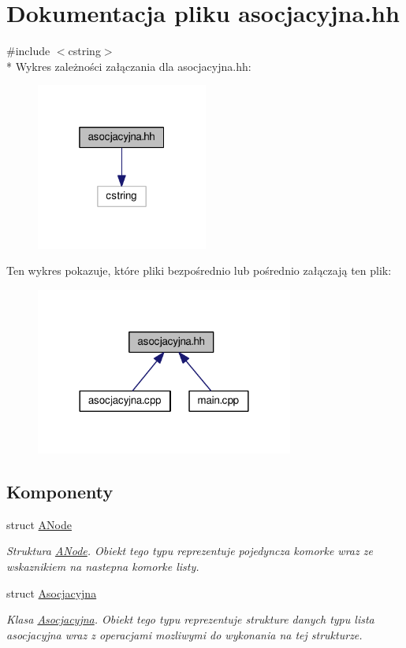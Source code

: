 \hypertarget{asocjacyjna_8hh}{\section{Dokumentacja pliku asocjacyjna.\-hh}
\label{asocjacyjna_8hh}
}
{\ttfamily \#include $<$cstring$>$}\\*
Wykres zależności załączania dla asocjacyjna.\-hh\-:
\nopagebreak
\begin{figure}[H]
\begin{center}
\leavevmode
\includegraphics[width=160pt]{asocjacyjna_8hh__incl}
\end{center}
\end{figure}
Ten wykres pokazuje, które pliki bezpośrednio lub pośrednio załączają ten plik\-:
\nopagebreak
\begin{figure}[H]
\begin{center}
\leavevmode
\includegraphics[width=240pt]{asocjacyjna_8hh__dep__incl}
\end{center}
\end{figure}
\subsection*{Komponenty}
\begin{DoxyCompactItemize}
\item 
struct \hyperlink{struct_a_node}{A\-Node}
\begin{DoxyCompactList}\small\item\em Struktura \hyperlink{struct_a_node}{A\-Node}. Obiekt tego typu reprezentuje pojedyncza komorke wraz ze wskaznikiem na nastepna komorke listy. \end{DoxyCompactList}\item 
struct \hyperlink{struct_asocjacyjna}{Asocjacyjna}
\begin{DoxyCompactList}\small\item\em Klasa \hyperlink{struct_asocjacyjna}{Asocjacyjna}. Obiekt tego typu reprezentuje strukture danych typu lista asocjacyjna wraz z operacjami mozliwymi do wykonania na tej strukturze. \end{DoxyCompactList}\end{DoxyCompactItemize}
